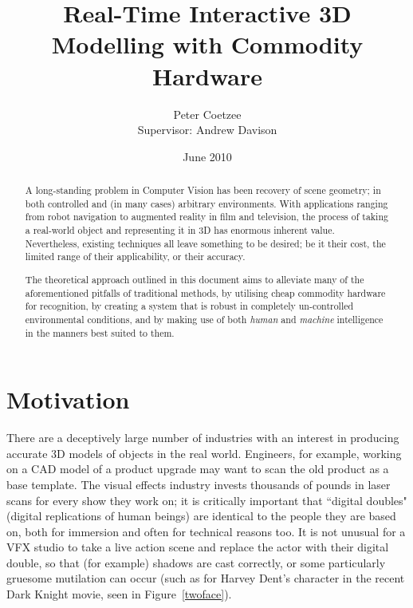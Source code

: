 \documentclass[a4paper,10pt]{article}
\title{Real-Time Interactive 3D Modelling with Commodity Hardware
\vspace{30pt}}
\author{Peter Coetzee\\Supervisor: Andrew Davison
\vspace{30pt}}
\date{June 2010}
\begin{document}
\maketitle

\vspace{50pt}

\begin{abstract}
A long-standing problem in Computer Vision has been recovery of scene geometry; in both controlled and (in many cases) arbitrary environments. With applications ranging from robot navigation to augmented reality in film and television, the process of taking a real-world object and representing it in 3D has enormous inherent value. Nevertheless, existing techniques all leave something to be desired; be it their cost, the limited range of their applicability, or their accuracy.

The theoretical approach outlined in this document aims to alleviate many of the aforementioned pitfalls of traditional methods, by utilising cheap commodity hardware for recognition, by creating a system that is robust in completely un-controlled environmental conditions, and by making use of both \textit{human} and \textit{machine} intelligence in the manners best suited to them.
\end{abstract}

\pagebreak
\tableofcontents
\pagebreak

\begingroup
\renewcommand*{\addvspace}[1]{}
\setlength{\cftbeforefigskip}{5px}
\listoffigures
\endgroup

\newpage
{}

\section{Motivation}
There are a deceptively large number of industries with an interest in producing accurate 3D models of objects in the real world. Engineers, for example, working on a CAD model of a product upgrade may want to scan the old product as a base template. The visual effects industry invests thousands of pounds in laser scans for every show they work on; it is critically important that ``digital doubles" (digital replications of human beings) are identical to the people they are based on, both for immersion and often for technical reasons too. It is not unusual for a VFX studio to take a live action scene and replace the actor with their digital double, so that (for example) shadows are cast correctly, or some particularly gruesome mutilation can occur (such as for Harvey Dent's character in the recent Dark Knight movie, seen in Figure~\ref{twoface}).
\end{document}
